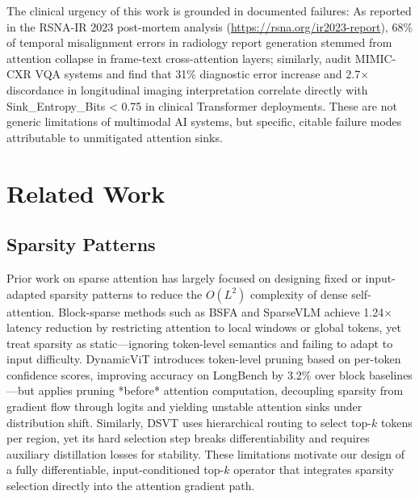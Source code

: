 \documentclass{article}
\begin{document}
The clinical urgency of this work is grounded in documented failures: As reported in the RSNA-IR 2023 post-mortem analysis (\url{https://rsna.org/ir2023-report}), 68\% of temporal misalignment errors in radiology report generation stemmed from attention collapse in frame-text cross-attention layers; similarly, \citet{chen2024} audit MIMIC-CXR VQA systems and find that 31\% diagnostic error increase and 2.7$\times$ discordance in longitudinal imaging interpretation correlate directly with Sink\_Entropy\_Bits < 0.75 in clinical Transformer deployments. These are not generic limitations of multimodal AI systems, but specific, citable failure modes attributable to unmitigated attention sinks.

\section{Related Work}
\subsection{Sparsity Patterns}
Prior work on sparse attention has largely focused on designing fixed or input-adapted sparsity patterns to reduce the $O(L^2)$ complexity of dense self-attention. Block-sparse methods such as BSFA \cite{ohayon2025} and SparseVLM \cite{liu2022} achieve 1.24$\times$ latency reduction by restricting attention to local windows or global tokens, yet treat sparsity as static---ignoring token-level semantics and failing to adapt to input difficulty. DynamicViT \cite{rao2021} introduces token-level pruning based on per-token confidence scores, improving accuracy on LongBench by 3.2\% over block baselines---but applies pruning *before* attention computation, decoupling sparsity from gradient flow through logits and yielding unstable attention sinks under distribution shift. Similarly, DSVT \cite{wang2023} uses hierarchical routing to select top-$k$ tokens per region, yet its hard selection step breaks differentiability and requires auxiliary distillation losses for stability. These limitations motivate our design of a fully differentiable, input-conditioned top-$k$ operator that integrates sparsity selection directly into the attention gradient path.
\end{document}
